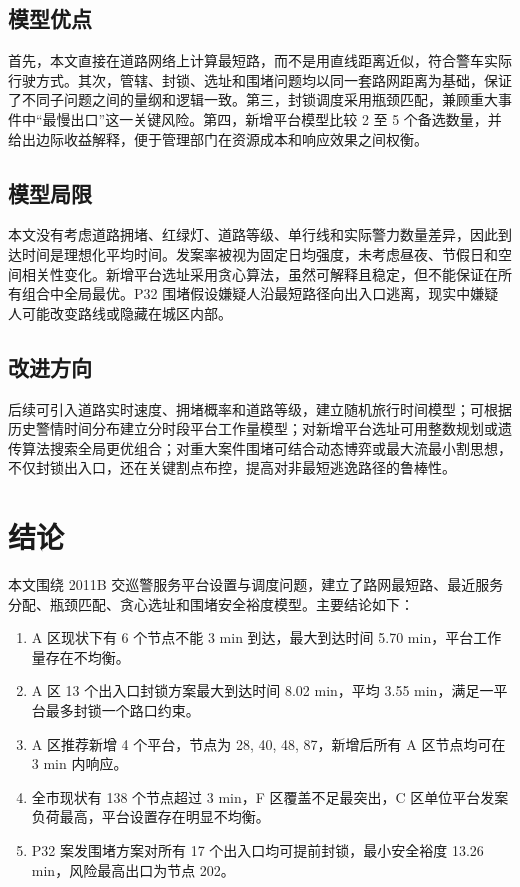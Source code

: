 \documentclass[UTF8,a4paper,12pt]{ctexart}
\begin{document}
\subsection{模型优点}
首先，本文直接在道路网络上计算最短路，而不是用直线距离近似，符合警车实际行驶方式。其次，管辖、封锁、选址和围堵问题均以同一套路网距离为基础，保证了不同子问题之间的量纲和逻辑一致。第三，封锁调度采用瓶颈匹配，兼顾重大事件中“最慢出口”这一关键风险。第四，新增平台模型比较 2 至 5 个备选数量，并给出边际收益解释，便于管理部门在资源成本和响应效果之间权衡。

\subsection{模型局限}
本文没有考虑道路拥堵、红绿灯、道路等级、单行线和实际警力数量差异，因此到达时间是理想化平均时间。发案率被视为固定日均强度，未考虑昼夜、节假日和空间相关性变化。新增平台选址采用贪心算法，虽然可解释且稳定，但不能保证在所有组合中全局最优。P32 围堵假设嫌疑人沿最短路径向出入口逃离，现实中嫌疑人可能改变路线或隐藏在城区内部。

\subsection{改进方向}
后续可引入道路实时速度、拥堵概率和道路等级，建立随机旅行时间模型；可根据历史警情时间分布建立分时段平台工作量模型；对新增平台选址可用整数规划或遗传算法搜索全局更优组合；对重大案件围堵可结合动态博弈或最大流最小割思想，不仅封锁出入口，还在关键割点布控，提高对非最短逃逸路径的鲁棒性。

\section{结论}
本文围绕 2011B 交巡警服务平台设置与调度问题，建立了路网最短路、最近服务分配、瓶颈匹配、贪心选址和围堵安全裕度模型。主要结论如下：
\begin{enumerate}[label=(\arabic*)]
  \item A 区现状下有 6 个节点不能 3 min 到达，最大到达时间 5.70 min，平台工作量存在不均衡。
  \item A 区 13 个出入口封锁方案最大到达时间 8.02 min，平均 3.55 min，满足一平台最多封锁一个路口约束。
  \item A 区推荐新增 4 个平台，节点为 28, 40, 48, 87，新增后所有 A 区节点均可在 3 min 内响应。
  \item 全市现状有 138 个节点超过 3 min，F 区覆盖不足最突出，C 区单位平台发案负荷最高，平台设置存在明显不均衡。
  \item P32 案发围堵方案对所有 17 个出入口均可提前封锁，最小安全裕度 13.26 min，风险最高出口为节点 202。
\end{enumerate}
\end{document}
